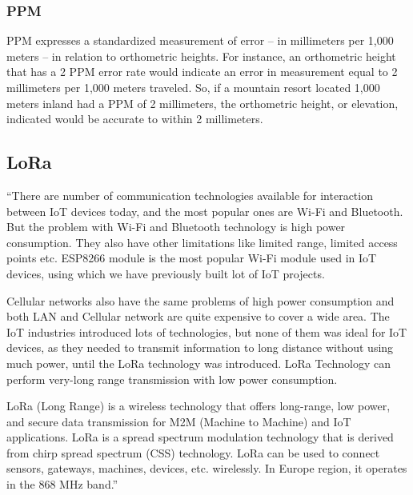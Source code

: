 \subsubsection{PPM}\label{sec:II_rtk_parameters_ppm}

PPM expresses a standardized measurement of error -- in millimeters per 1,000 meters -- in relation to orthometric heights. For instance, an orthometric height that has a 2 PPM error rate would indicate an error in measurement equal to 2 millimeters per 1,000 meters traveled. So, if a mountain resort located 1,000 meters inland had a PPM of 2 millimeters, the orthometric height, or elevation, indicated would be accurate to within 2 millimeters.

\subsection{LoRa}\label{sec:II_rtk_LoRa}

``There are number of communication technologies available for interaction between IoT devices today, and the most popular ones are Wi-Fi and Bluetooth. But the problem with Wi-Fi and Bluetooth technology is high power consumption. They also have other limitations like limited range, limited access points etc. ESP8266 module is the most popular Wi-Fi module used in IoT devices, using which we have previously built lot of IoT projects.

Cellular networks also have the same problems of high power consumption and both LAN and Cellular network are quite expensive to cover a wide area. The IoT industries introduced lots of technologies, but none of them was ideal for IoT devices, as they needed to transmit information to long distance without using much power, until the LoRa technology was introduced. LoRa Technology can perform very-long range transmission with low power consumption.

LoRa (Long Range) is a wireless technology that offers long-range, low power, and secure data transmission for M2M (Machine to Machine) and IoT applications. LoRa is a spread spectrum modulation technology that is derived from chirp spread spectrum (CSS) technology. LoRa can be used to connect sensors, gateways, machines, devices, etc. wirelessly. In Europe region, it operates in the 868 MHz band.'' %

